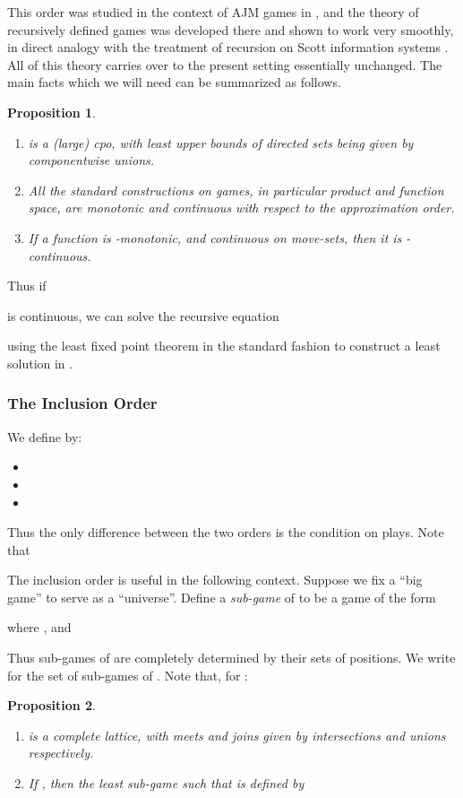 \documentclass[a4paper,11pt]{article}
\newtheorem{proposition}{Proposition}[section]
\begin{document}
This order was studied in the context of AJM games in \cite{AM95}, and the
theory of recursively defined games was developed there and shown to
work very smoothly, in direct analogy with the treatment of recursion
on Scott information systems \cite{Win93}. All of this theory carries over
to the present setting essentially unchanged. The main facts which we
will need can be summarized as follows.
\begin{proposition}
\label{domapprox}
\begin{enumerate}
\item  is a (large) cpo, with least upper
  bounds of directed sets being given by componentwise unions.
\item All the standard constructions on games, in particular
  product and function space, are monotonic and continuous with
  respect to the approximation order.
\item If a function  is
  -monotonic, and continuous on move-sets, then it is
  -continuous.
\end{enumerate}
\end{proposition}

\noindent Thus if

is continuous, we can solve the recursive equation

using the least fixed point theorem in the standard fashion to
construct a least solution in .

\subsubsection{The Inclusion Order}
We define  by:
\begin{itemize}
\item 
\item 
\item 
\end{itemize}
Thus the only difference between the two orders is the condition
on plays. Note that

The inclusion order is useful in the following context. Suppose we fix
a ``big game''  to serve as a ``universe''. Define a
\emph{sub-game} of  to be a game of the form

where , and

Thus sub-games of  are completely determined by their sets of
positions. We write  for the set of sub-games of
. Note that, for :

\begin{proposition}
\label{SubU}
\begin{enumerate}
\item  is a complete lattice, with meets and joins given by
  intersections and unions respectively.
\item If , then the least sub-game 
  such that  is defined by

\end{enumerate}
\end{proposition}
\end{document}
